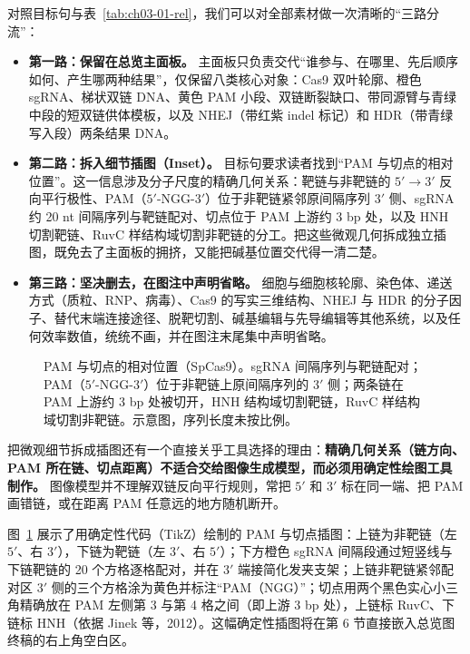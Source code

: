 对照目标句与表~\ref{tab:ch03-01-rel}，我们可以对全部素材做一次清晰的“三路分流”：

\begin{itemize}
\item \textbf{第一路：保留在总览主面板。} 主面板只负责交代“谁参与、在哪里、先后顺序如何、产生哪两种结果”，仅保留八类核心对象：Cas9 双叶轮廓、橙色 sgRNA、梯状双链 DNA、黄色 PAM 小段、双链断裂缺口、带同源臂与青绿中段的短双链供体模板，以及 NHEJ（带红紫 indel 标记）和 HDR（带青绿写入段）两条结果 DNA。
\item \textbf{第二路：拆入细节插图（Inset）。} 目标句要求读者找到“PAM 与切点的相对位置”。这一信息涉及分子尺度的精确几何关系：靶链与非靶链的 $5'\rightarrow 3'$ 反向平行极性、PAM（$5'$-NGG-$3'$）位于非靶链紧邻原间隔序列 $3'$ 侧、sgRNA 约 20 nt 间隔序列与靶链配对、切点位于 PAM 上游约 3 bp 处，以及 HNH 切割靶链、RuvC 样结构域切割非靶链的分工。把这些微观几何拆成独立插图，既免去了主面板的拥挤，又能把碱基位置交代得一清二楚。
\item \textbf{第三路：坚决删去，在图注中声明省略。} 细胞与细胞核轮廓、染色体、递送方式（质粒、RNP、病毒）、Cas9 的写实三维结构、NHEJ 与 HDR 的分子因子、替代末端连接途径、脱靶切割、碱基编辑与先导编辑等其他系统，以及任何效率数值，统统不画，并在图注末尾集中声明省略。
\end{itemize}

\begin{figure}[htbp]\centering

\caption{PAM 与切点的相对位置（SpCas9）。sgRNA 间隔序列与靶链配对；PAM（$5'$-NGG-$3'$）位于非靶链上原间隔序列的 $3'$ 侧；两条链在 PAM 上游约 3 bp 处被切开，HNH 结构域切割靶链，RuvC 样结构域切割非靶链。示意图，序列长度未按比例。}\label{fig:ch03-07}
\end{figure}

把微观细节拆成插图还有一个直接关乎工具选择的理由：\textbf{精确几何关系（链方向、PAM 所在链、切点距离）不适合交给图像生成模型，而必须用确定性绘图工具制作。} 图像模型并不理解双链反向平行规则，常把 $5'$ 和 $3'$ 标在同一端、把 PAM 画错链，或在距离 PAM 任意远的地方随机断开。

图~\ref{fig:ch03-07} 展示了用确定性代码（TikZ）绘制的 PAM 与切点插图：上链为非靶链（左 $5'$、右 $3'$），下链为靶链（左 $3'$、右 $5'$）；下方橙色 sgRNA 间隔段通过短竖线与下链靶链的 20 个方格逐格配对，并在 $3'$ 端接简化发夹支架；上链非靶链紧邻配对区 $3'$ 侧的三个方格涂为黄色并标注“PAM（NGG）”；切点用两个黑色实心小三角精确放在 PAM 左侧第 3 与第 4 格之间（即上游 3 bp 处），上链标 RuvC、下链标 HNH（依据 Jinek 等，2012）。这幅确定性插图将在第 6 节直接嵌入总览图终稿的右上角空白区。

